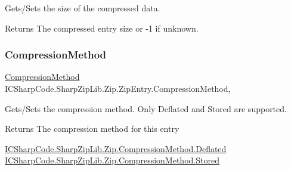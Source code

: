 Gets/\+Sets the size of the compressed data. 

\begin{DoxyReturn}{Returns}
The compressed entry size or -\/1 if unknown. 
\end{DoxyReturn}
\mbox{\label{class_i_c_sharp_code_1_1_sharp_zip_lib_1_1_zip_1_1_zip_entry_a1c4996433278e904adf2b5a6fe8718c0}} 
\subsubsection{\texorpdfstring{Compression\+Method}{CompressionMethod}}
{\footnotesize\ttfamily \hyperlink{namespace_i_c_sharp_code_1_1_sharp_zip_lib_1_1_zip_a90a0e174eca72bf6b490bae40d83a09e}{Compression\+Method} I\+C\+Sharp\+Code.\+Sharp\+Zip\+Lib.\+Zip.\+Zip\+Entry.\+Compression\+Method\hspace{0.3cm}{\ttfamily [get]}, {\ttfamily [set]}}



Gets/\+Sets the compression method. Only Deflated and Stored are supported. 

\begin{DoxyReturn}{Returns}
The compression method for this entry 
\end{DoxyReturn}
\hyperlink{namespace_i_c_sharp_code_1_1_sharp_zip_lib_1_1_zip_a90a0e174eca72bf6b490bae40d83a09eadf0f5c624593b88a2cb8cf43e1d1cb05}{I\+C\+Sharp\+Code.\+Sharp\+Zip\+Lib.\+Zip.\+Compression\+Method.\+Deflated} \hyperlink{namespace_i_c_sharp_code_1_1_sharp_zip_lib_1_1_zip_a90a0e174eca72bf6b490bae40d83a09ea7bf2d26eab899c413218b729d4d914b7}{I\+C\+Sharp\+Code.\+Sharp\+Zip\+Lib.\+Zip.\+Compression\+Method.\+Stored} \mbox{\label{class_i_c_sharp_code_1_1_sharp_zip_lib_1_1_zip_1_1_zip_entry_ac4fb0517f47ac39edf30324447ae3e5a}} 
